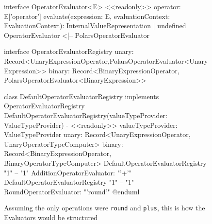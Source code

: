 \begin{figure}
\begin{plantuml}
		interface OperatorEvaluator<E> {
				<<readonly>> operator: E['operator']
				evaluate(expression: E, evaluationContext: EvaluationContext): InternalValueRepresentation | undefined
			}
		OperatorEvaluator <|-- PolarsOperatorEvaluator

		interface OperatorEvaluatorRegistry {
				unary: Record<UnaryExpressionOperator,PolarsOperatorEvaluator<UnaryExpression>>
				binary: Record<BinaryExpressionOperator, PolarsOperatorEvaluator<BinaryExpression>>
			}

		class DefaultOperatorEvaluatorRegistry implements OperatorEvaluatorRegistry {
				DefaultOperatorEvaluatorRegistry(valueTypeProvider: ValueTypeProvider)
				- <<readonly>> valueTypeProvider: ValueTypeProvider
				unary: Record<UnaryExpressionOperator, UnaryOperatorTypeComputer>
				binary: Record<BinaryExpressionOperator, BinaryOperatorTypeComputer>
			}
		DefaultOperatorEvaluatorRegistry "1" -- "1" AdditionOperatorEvaluator: "'+'"
		DefaultOperatorEvaluatorRegistry "1" -- "1" RoundOperatorEvaluator: "'round'"
		@enduml
	\end{plantuml}
	\caption{Assuming the only operations were \Verb|round| and \Verb|plus|, this is how the Evaluators would be structured}
	\label{fig:uml:evaluators}
\end{figure}

